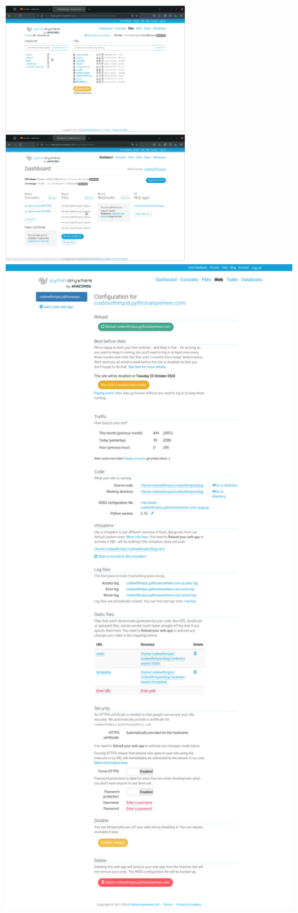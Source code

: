 \documentclass[a4paper,11pt]{article}
\begin{document}
        \includegraphics[width=0.5\textwidth]{PUBLICATION/screen8.png}
        \includegraphics[width=0.5\textwidth]{PUBLICATION/screen6.png}
        \includegraphics[width=0.8\textwidth]{PUBLICATION/screen10.png}\\
\end{document}
